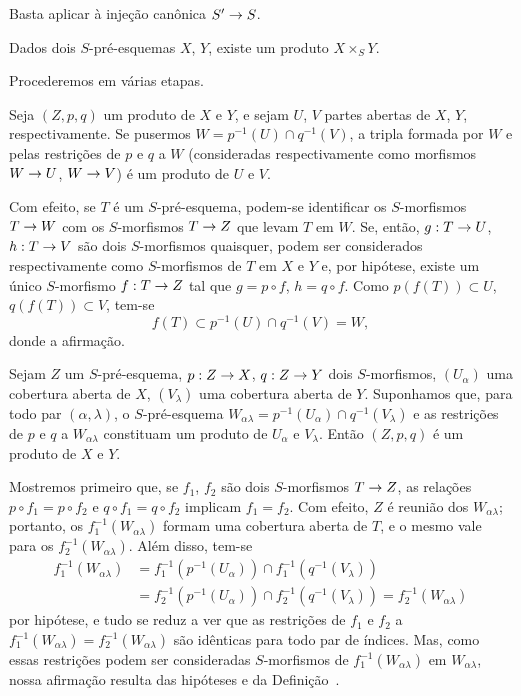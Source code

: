 \documentclass[oneside]{amsart}
\makeatletter
\newcommand{\ega@arrow}[2]{\mathchoice{#1}{#2}{#2}{#2}}
\renewcommand{\to}{\ega@arrow{\longrightarrow}{\rightarrow}}
\newcommand{\oldpage}[2][]{{\marginnote{\normalfont\textbf{#1}~|~#2}}\ignorespaces}
\let\EGAOriginalLabel\label
\renewcommand{\label}[1]{\phantomsection\EGAOriginalLabel{#1}}
\makeatother
\begin{document}
\oldpage[I]{106}
Basta aplicar  à injeção canônica $S'\to S$.

\begin{theorem}[3.2.6]
\label{I.3.2.6}
Dados dois $S$-pré-esquemas $X$, $Y$, existe um produto $X\times_S Y$.
\end{theorem}

Procederemos em várias etapas.

\begin{lemma}[3.2.6.1]
\label{I.3.2.6.1}
Seja $(Z,p,q)$ um produto de $X$ e $Y$, e sejam $U$, $V$ partes abertas de
$X$, $Y$, respectivamente. Se pusermos
$W=p^{-1}(U)\cap q^{-1}(V)$, a tripla formada por $W$ e pelas restrições de
$p$ e $q$ a $W$ \textup{(consideradas respectivamente como morfismos
$W\to U$, $W\to V$)} é um produto de $U$ e $V$.
\end{lemma}

Com efeito, se $T$ é um $S$-pré-esquema, podem-se identificar os
$S$-morfismos $T\to W$ com os $S$-morfismos $T\to Z$ que levam $T$ em $W$.
Se, então, $g:T\to U$, $h:T\to V$ são dois $S$-morfismos quaisquer, podem
ser considerados respectivamente como $S$-morfismos de $T$ em $X$ e $Y$ e,
por hipótese, existe um único $S$-morfismo $f:T\to Z$ tal que
$g=p\circ f$, $h=q\circ f$. Como $p(f(T))\subset U$, $q(f(T))\subset V$,
tem-se
\[
  f(T)\subset p^{-1}(U)\cap q^{-1}(V)=W,
\]
donde a afirmação.

\begin{lemma}[3.2.6.2]
\label{I.3.2.6.2}
Sejam $Z$ um $S$-pré-esquema, $p:Z\to X$, $q:Z\to Y$ dois
$S$-morfismos, $(U_\alpha)$ uma cobertura aberta de $X$, $(V_\lambda)$ uma
cobertura aberta de $Y$. Suponhamos que, para todo par $(\alpha,\lambda)$, o
$S$-pré-esquema
$W_{\alpha\lambda}=p^{-1}(U_\alpha)\cap q^{-1}(V_\lambda)$ e as restrições de
$p$ e $q$ a $W_{\alpha\lambda}$ constituam um produto de $U_\alpha$ e
$V_\lambda$. Então $(Z,p,q)$ é um produto de $X$ e $Y$.
\end{lemma}

Mostremos primeiro que, se $f_1$, $f_2$ são dois $S$-morfismos $T\to Z$, as
relações $p\circ f_1=p\circ f_2$ e $q\circ f_1=q\circ f_2$ implicam
$f_1=f_2$. Com efeito, $Z$ é reunião dos $W_{\alpha\lambda}$; portanto, os
$f_1^{-1}(W_{\alpha\lambda})$ formam uma cobertura aberta de $T$, e o mesmo
vale para os $f_2^{-1}(W_{\alpha\lambda})$. Além disso, tem-se
\[
\begin{aligned}
  f_1^{-1}(W_{\alpha\lambda})
  &=f_1^{-1}(p^{-1}(U_\alpha))\cap
    f_1^{-1}(q^{-1}(V_\lambda)) \\
  &=f_2^{-1}(p^{-1}(U_\alpha))\cap
    f_2^{-1}(q^{-1}(V_\lambda))
   =f_2^{-1}(W_{\alpha\lambda})
\end{aligned}
\]
por hipótese, e tudo se reduz a ver que as restrições de $f_1$ e $f_2$ a
$f_1^{-1}(W_{\alpha\lambda})=f_2^{-1}(W_{\alpha\lambda})$ são idênticas para
todo par de índices. Mas, como essas restrições podem ser consideradas
$S$-morfismos de $f_1^{-1}(W_{\alpha\lambda})$ em $W_{\alpha\lambda}$, nossa
afirmação resulta das hipóteses e da Definição~.
\end{document}
